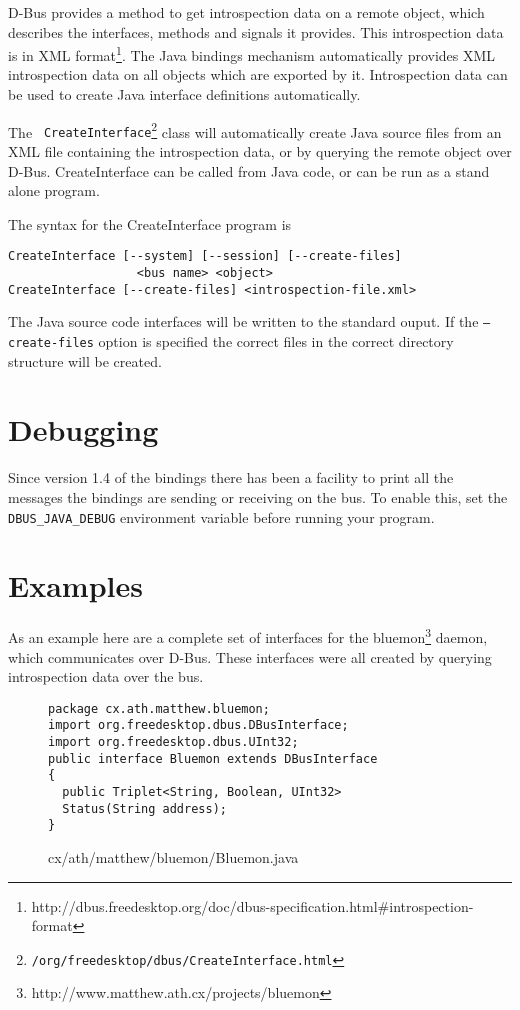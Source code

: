 \documentclass[a4paper,12pt]{article}
\begin{document}
D-Bus provides a method to get introspection data on a remote object,
which describes the interfaces, methods and signals it provides.
This introspection data is in XML
format\footnote{http://dbus.freedesktop.org/doc/dbus-specification.html\#introspection-format}.
The Java bindings mechanism automatically provides XML introspection data on all
objects which are exported by it.  Introspection data can be used to create
Java interface definitions automatically.

The {\tt
CreateInterface\footnote{\javadocroot/org/freedesktop/dbus/CreateInterface.html}}
class will automatically create Java source files from an XML file
containing the introspection data, or by querying the remote object
over D-Bus.  CreateInterface can be called from Java code, or can be run as a
stand alone program.  

The syntax for the CreateInterface program is

\begin{verbatim}
CreateInterface [--system] [--session] [--create-files] 
                  <bus name> <object>
CreateInterface [--create-files] <introspection-file.xml>
\end{verbatim}

The Java source code interfaces will be written to the standard ouput. If the
{\tt --create-files} option is specified the correct files in the
correct directory structure will be created.

\section{Debugging}

Since version 1.4 of the bindings there has been a facility to print all the
messages the bindings are sending or receiving on the bus. To enable this, set
the {\tt DBUS\_JAVA\_DEBUG} environment variable before running your program.

\section{Examples}

As an example here are a complete set of interfaces for the
bluemon\footnote{http://www.matthew.ath.cx/projects/bluemon} daemon,
which communicates over D-Bus. These interfaces were all created by
querying introspection data over the bus.

\newpage

\begin{figure}[!h]
\begin{center}
\begin{verbatim}
package cx.ath.matthew.bluemon;
import org.freedesktop.dbus.DBusInterface;
import org.freedesktop.dbus.UInt32;
public interface Bluemon extends DBusInterface
{
  public Triplet<String, Boolean, UInt32> 
  Status(String address);
}
\end{verbatim}
\end{center}
\caption{cx/ath/matthew/bluemon/Bluemon.java}
\end{figure}
\end{document}
